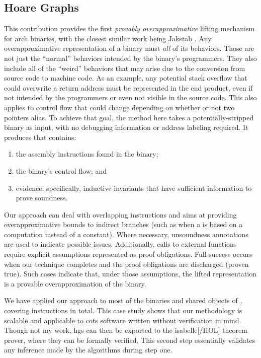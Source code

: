 \subsection{Hoare Graphs}
This contribution provides the first \emph{provably overapproximative} lifting mechanism for \gls{arch} binaries, with the closest similar work being Jakstab \autocite{kinder2010static,kinder2012alternating,kinder2012virtualization}.
Any overapproximative representation of a binary must \emph{all} of its behaviors.
Those are not just the ``normal'' behaviors intended by the binary's programmers.
They also include all of the ``weird'' behaviors that may arise due to the conversion from source code to machine code.
As an example, any potential stack overflow that could overwrite a return address must be represented in the end product, even if not intended by the programmers or even not visible in the source code.
This also applies to control flow that could change depending on whether or not two pointers alias.
To achieve that goal, the method here takes a potentially-stripped binary as input, with no debugging information or address labeling required.
It produces  that contains:
\begin{enumerate}
  \item the assembly instructions found in the binary;
  \item the binary's control flow; and
  \item evidence: specifically, inductive invariants that have sufficient information to prove soundness.
\end{enumerate}
Our approach can deal with overlapping instructions and aims at providing overapproximative bounds to indirect branches (such as when a  is based on a computation instead of a constant).
Where necessary, unsoundness annotations are used to indicate possible issues.
Additionally, calls to external functions require explicit assumptions represented as proof obligations.
Full success occurs when our technique completes and the proof obligations are discharged (proven true).
Such cases indicate that, under those assumptions, the lifted representation is a provable overapproximation of the binary.

We have applied our approach to most of the binaries and shared objects of , covering  instructions in total.
This case study shows that our methodology is scalable and applicable to \gls{cots} software written without verification in mind.
Though not my work, \glspl{hg} can then be exported to the \gls{isabelle}[/HOL] theorem prover, where they can be formally verified.
This second step essentially validates any inference made by the algorithms during step one.

